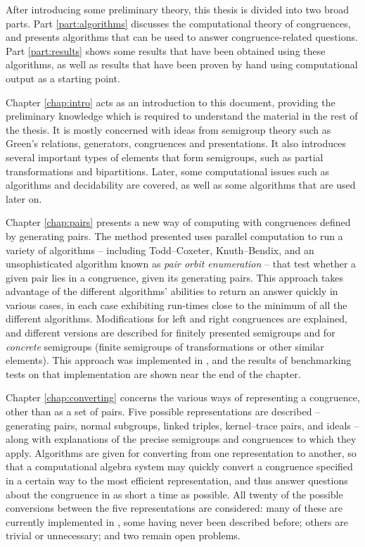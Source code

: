 After introducing some preliminary theory, this thesis is divided into two broad
parts.  Part \ref{part:algorithms} discusses the computational theory of
congruences, and presents algorithms that can be used to answer
congruence-related questions.  Part \ref{part:results} shows some results that
have been obtained using these algorithms, as well as results that have been
proven by hand using computational output as a starting point.

Chapter \ref{chap:intro} acts as an introduction to this document, providing the
preliminary knowledge which is required to understand the material in the rest
of the thesis.  It is mostly concerned with ideas from semigroup theory such as
Green's relations, generators, congruences and presentations.  It also
introduces several important types of elements that form semigroups, such as
partial transformations and bipartitions.  Later, some computational issues such
as algorithms and decidability are covered, as well as some algorithms that are
used later on.

Chapter \ref{chap:pairs} presents a new way of computing with congruences
defined by generating pairs.  The method presented uses parallel computation to
run a variety of algorithms -- including Todd--Coxeter, Knuth--Bendix, and an
unsophisticated algorithm known as \textit{pair orbit enumeration} -- that test
whether a given pair lies in a congruence, given its generating pairs.  This
approach takes advantage of the different algorithms' abilities to return an
answer quickly in various cases, in each case exhibiting run-times close to the
minimum of all the different algorithms.  Modifications for left and right
congruences are explained, and different versions are described for finitely
presented semigroups and for \textit{concrete} semigroups (finite semigroups of
transformations or other similar elements).  This approach was implemented in
\libsemigroups{} \cite{libsemigroups}, and the results of benchmarking tests on
that implementation are shown near the end of the chapter.

Chapter \ref{chap:converting} concerns the various ways of representing a
congruence, other than as a set of pairs.  Five possible representations are
described -- generating pairs, normal subgroups, linked triples, kernel--trace
pairs, and ideals -- along with explanations of the precise semigroups and
congruences to which they apply.  Algorithms are given for converting from one
representation to another, so that a computational algebra system may quickly
convert a congruence specified in a certain way to the most efficient
representation, and thus answer questions about the congruence in as short a
time as possible.  All twenty of the possible conversions between the five
representations are considered: many of these are currently implemented in
\Semigroups{} \cite{semigroups}, some having never been described before; others
are trivial or unnecessary; and two remain open problems.

